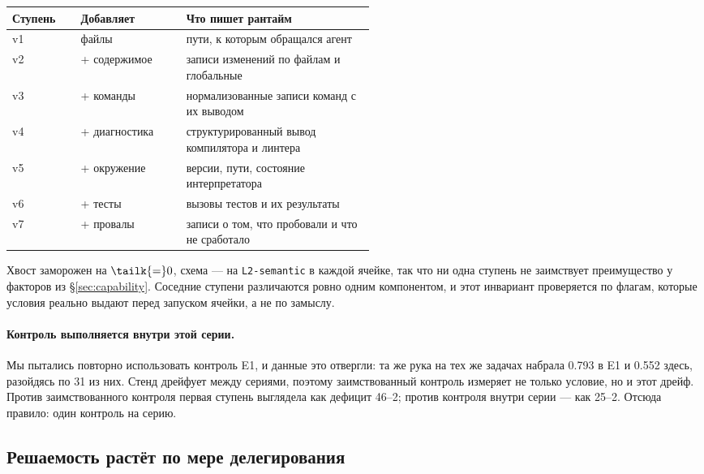 \begin{center}
\begin{tabular}{@{}llp{0.52\linewidth}@{}}
\toprule
Ступень & Добавляет & Что пишет рантайм \\
\midrule
v1 & файлы        & пути, к которым обращался агент \\
v2 & + содержимое    & записи изменений по файлам и глобальные \\
v3 & + команды   & нормализованные записи команд с их выводом \\
v4 & + диагностика& структурированный вывод компилятора и линтера \\
v5 & + окружение& версии, пути, состояние интерпретатора \\
v6 & + тесты   & вызовы тестов и их результаты \\
v7 & + провалы   & записи о том, что пробовали и что не сработало \\
\bottomrule
\end{tabular}
\end{center}

Хвост заморожен на $\tailk{=}0$, схема — на \texttt{L2-semantic} в каждой
ячейке, так что ни одна ступень не заимствует преимущество у факторов из
\S\ref{sec:capability}. Соседние ступени различаются ровно одним компонентом,
и этот инвариант проверяется по флагам, которые условия реально выдают
перед запуском ячейки, а не по замыслу\code.

\paragraph{Контроль выполняется внутри этой серии.} Мы пытались повторно
использовать контроль E1, и данные это отвергли: та же рука на тех же
\VTasks{} задачах набрала 0.793 в E1 и 0.552 здесь, разойдясь по 31 из
них\live. Стенд дрейфует между сериями, поэтому заимствованный контроль
измеряет не только условие, но и этот дрейф. Против заимствованного контроля
первая ступень выглядела как дефицит 46--2; против контроля внутри серии —
как 25--2. Отсюда правило: один контроль на серию.

\subsection{Решаемость растёт по мере делегирования}

\begin{table}[t]
\centering
\caption{Лестница композиции. Стоимость, ходы и вывод — медианы по задачам,
которые решили и ступень, и контроль; отношения ниже $1$ в пользу ступени.}
\label{tab:ladder}

\end{table}

